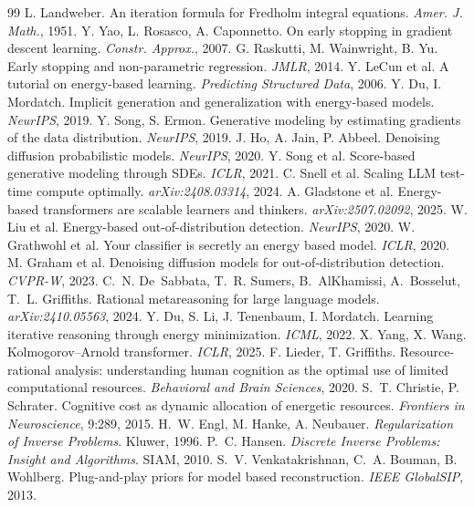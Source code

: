 \documentclass[letterpaper]{article}
\begin{document}
\begin{thebibliography}{99}
\small
{} L. Landweber. An iteration formula for Fredholm integral equations. \emph{Amer. J. Math.}, 1951.
 Y. Yao, L. Rosasco, A. Caponnetto. On early stopping in gradient descent learning. \emph{Constr. Approx.}, 2007.
 G. Raskutti, M. Wainwright, B. Yu. Early stopping and non-parametric regression. \emph{JMLR}, 2014.
 Y. LeCun et al. A tutorial on energy-based learning. \emph{Predicting Structured Data}, 2006.
 Y. Du, I. Mordatch. Implicit generation and generalization with energy-based models. \emph{NeurIPS}, 2019.
 Y. Song, S. Ermon. Generative modeling by estimating gradients of the data distribution. \emph{NeurIPS}, 2019.
 J. Ho, A. Jain, P. Abbeel. Denoising diffusion probabilistic models. \emph{NeurIPS}, 2020.
 Y. Song et al. Score-based generative modeling through SDEs. \emph{ICLR}, 2021.
 C. Snell et al. Scaling LLM test-time compute optimally. \emph{arXiv:2408.03314}, 2024.
 A. Gladstone et al. Energy-based transformers are scalable learners and thinkers. \emph{arXiv:2507.02092}, 2025.
 W. Liu et al. Energy-based out-of-distribution detection. \emph{NeurIPS}, 2020.
 W. Grathwohl et al. Your classifier is secretly an energy based model. \emph{ICLR}, 2020.
 M. Graham et al. Denoising diffusion models for out-of-distribution detection. \emph{CVPR-W}, 2023.
 C.~N. De~Sabbata, T.~R. Sumers, B.~AlKhamissi, A.~Bosselut, T.~L. Griffiths. Rational metareasoning for large language models. \emph{arXiv:2410.05563}, 2024.
 Y. Du, S. Li, J. Tenenbaum, I. Mordatch. Learning iterative reasoning through energy minimization. \emph{ICML}, 2022.
 X. Yang, X. Wang. Kolmogorov--Arnold transformer. \emph{ICLR}, 2025.
 F. Lieder, T. Griffiths. Resource-rational analysis: understanding human cognition as the optimal use of limited computational resources. \emph{Behavioral and Brain Sciences}, 2020.
 S.~T. Christie, P. Schrater. Cognitive cost as dynamic allocation of energetic resources. \emph{Frontiers in Neuroscience}, 9:289, 2015.
 H.~W. Engl, M. Hanke, A. Neubauer. \emph{Regularization of Inverse Problems}. Kluwer, 1996.
 P.~C. Hansen. \emph{Discrete Inverse Problems: Insight and Algorithms}. SIAM, 2010.
 S.~V. Venkatakrishnan, C.~A. Bouman, B. Wohlberg. Plug-and-play priors for model based reconstruction. \emph{IEEE GlobalSIP}, 2013.

\end{thebibliography}
\end{document}
